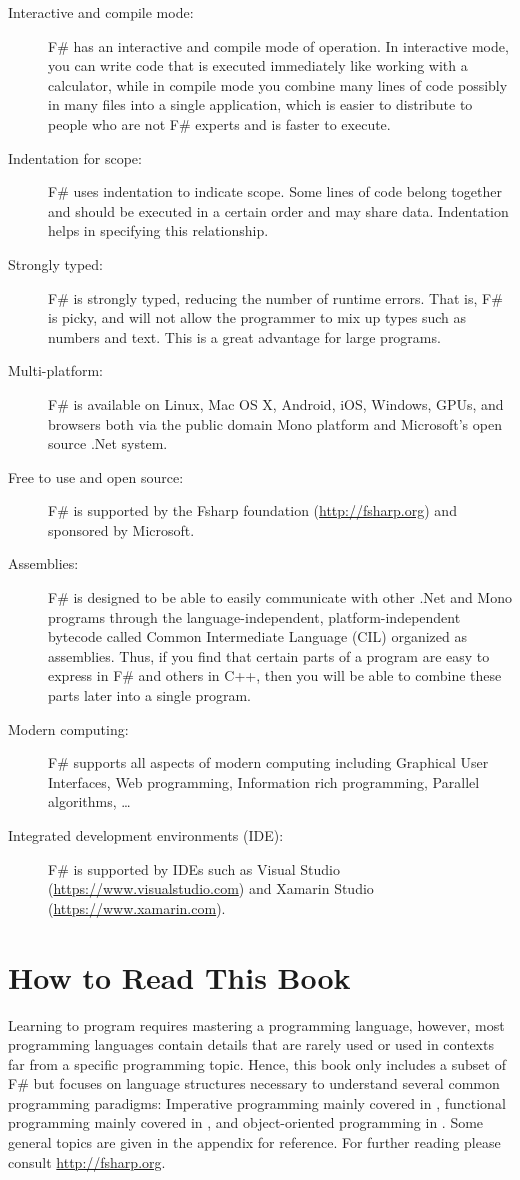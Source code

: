 \documentclass[fsharpNotes.tex]{subfiles}
\begin{document}
\begin{description}
\item[Interactive and compile mode:] F\# has an interactive and compile mode of operation. In interactive mode, you can write code that is executed immediately like working with a calculator, while in compile mode you combine many lines of code possibly in many files into a single application, which is easier to distribute to people who are not F\# experts and is faster to execute.
\item[Indentation for scope:] F\# uses indentation to indicate scope. Some lines of code belong together and should be executed in a certain order and may share data. Indentation helps in specifying this relationship.
\item[Strongly typed:] F\# is strongly typed, reducing the number of runtime errors. That is, F\# is picky, and will not allow the programmer to mix up types such as numbers and text. This is a great advantage for large programs.
\item[Multi-platform:] F\# is available on Linux, Mac OS X, Android, iOS, Windows, GPUs, and browsers both via the public domain Mono platform and Microsoft's open source .Net system.
\item[Free to use and open source:] F\# is supported by the Fsharp foundation (\url{http://fsharp.org}) and sponsored by Microsoft.
\item[Assemblies:] F\# is designed to be able to easily communicate with other .Net and Mono programs through the language-independent, platform-independent bytecode called Common Intermediate Language (CIL) organized as assemblies. Thus, if you find that certain parts of a program are easy to express in F\# and others in C++, then you will be able to combine these parts later into a single program.
\item[Modern computing:] F\# supports all aspects of modern computing including Graphical User Interfaces, Web programming, Information rich programming, Parallel algorithms, \dots
\item[Integrated development environments (IDE):] F\# is supported by IDEs such as Visual Studio (\url{https://www.visualstudio.com}) and Xamarin Studio (\url{https://www.xamarin.com}).
\end{description}

\section{How to Read This Book}
Learning to program requires mastering a programming language, however, most programming languages contain details that are rarely used or used in contexts far from a specific programming topic. Hence, this book only includes a subset of F\# but focuses on language structures necessary to understand several common programming paradigms: Imperative programming mainly covered in , functional programming mainly covered in , and object-oriented programming in .  Some general topics are given in the appendix for reference. For further reading please consult \url{http://fsharp.org}.
\end{document}

